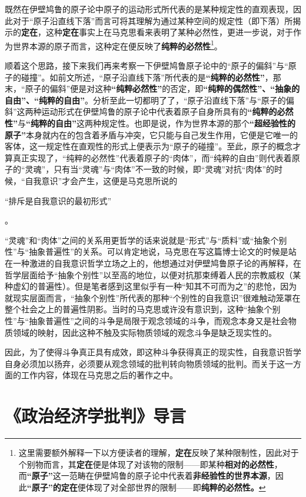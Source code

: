 \documentclass[a4paper,twoside,12pt]{ctexart}
\begin{document}
既然在伊壁鸠鲁的原子论中原子的运动形式所代表的是某种规定性的直观表现，因此对于“原子沿直线下落”而言可将其理解为通过某种空间的规定性（即下落）所揭示的\textbf{定在}，这种\textbf{定在}事实上在马克思看来表明了某种必然性，更进一步说，对于作为世界本源的原子而言，这种定在便反映了\textbf{纯粹的必然性}\footnote{这里需要额外解释一下以方便读者的理解，\textbf{定在}反映了某种限制性，因此对于个别物而言，其\textbf{定在}便是体现了对该物的限制——即某种\textbf{相对的必然性}，而\textbf{“原子”}这一范畴在伊壁鸠鲁的原子论中代表着\textbf{非经验性的世界本源}，因此\textbf{“原子”的定在}便体现了对全部世界的限制——即\textbf{纯粹的必然性。}}。

顺着这个思路，接下来我们再来考察一下伊壁鸠鲁原子论中的“原子的偏斜”与“原子的碰撞”。如前文所述，“原子沿直线下落”所代表的是\textbf{“纯粹的必然性”}，那末，“原子的偏斜”便是对这种\textbf{“纯粹必然性”}的否定，即\textbf{“纯粹的偶然性”、“抽象的自由”、“纯粹的自由”}。分析至此一切都明了了，“原子沿直线下落”与“原子的偏斜”这两种运动形式在伊壁鸠鲁的原子论中代表着原子自身所具有的\textbf{“纯粹的必然性”}与\textbf{“纯粹的自由”}这两种规定性。也即是说，作为世界本源的那个\textbf{“超经验性的原子”}本身就内在的包含着矛盾与冲突，它只能与自己发生作用，它便是它唯一的客体，这一规定性在直观性的形式上便表示为“原子的碰撞”。至此，原子的概念才算真正实现了，“纯粹的必然性”代表着原子的“肉体”，而“纯粹的自由”则代表着原子的“灵魂”，只有当“灵魂”与“肉体”不一致的时候，即“灵魂”对抗“肉体”的时候，“自我意识”才会产生，这便是马克思所说的\begin{fangsong}“排斥是自我意识的最初形式”    \end{fangsong}。

“灵魂”和“肉体”之间的关系用更哲学的话来说就是“形式”与“质料”或“抽象个别性”与“抽象普遍性”的关系。可以肯定地说，马克思在写这篇博士论文的时候是站在一种激进的自我意识哲学立场之上的，他想通过对伊壁鸠鲁原子论的再解释，在哲学层面给予“抽象个别性”以至高的地位，以便对抗那束缚着人民的宗教威权（某种虚幻的普遍性）。但是笔者感到这里似乎有一种“知其不可而为之”的悲怆，因为就现实层面而言，“抽象个别性”所代表的那种“个别性的自我意识”很难触动笼罩在整个社会之上的普遍性阴影。当时的马克思或许没有意识到，这种“抽象个别性”与“抽象普遍性”之间的斗争是局限于观念领域的斗争，而观念本身又是社会物质领域的映射，因此这种不触及实际物质领域的观念斗争是缺乏现实性的。

因此，为了使得斗争真正具有成效，即这种斗争获得真正的现实性，自我意识哲学自身必须加以扬弃，必须要从观念领域的批判转向物质领域的批判。而关于这一方面的工作内容，体现在马克思之后的著作之中。
\newpage
\section{《政治经济学批判》导言}
\end{document}
